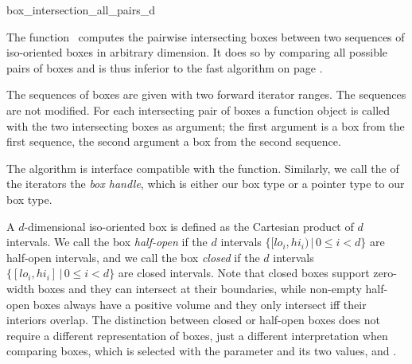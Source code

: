 

\begin{ccRefFunction}{box_intersection_all_pairs_d}

\ccDefinition
  
The function \ccRefName\ computes the pairwise intersecting boxes
between two sequences of iso-oriented boxes in arbitrary dimension.
It does so by comparing all possible pairs of boxes and is thus
inferior to the fast  algorithm on page
\pageref{ccRef_CGAL::box_intersection_d}.

The sequences of boxes are given with two forward iterator ranges. The
sequences are not modified. For each intersecting pair of boxes a
 function object is called with the two intersecting
boxes as argument; the first argument is a box from the first
sequence, the second argument a box from the second sequence.

The algorithm is interface compatible with the
 function. Similarly, we call the
 of the iterators the \emph{box handle}, which is
either our box type or a pointer type to our box type.

A $d$-dimensional iso-oriented box is defined as the
Cartesian product of $d$ intervals. We call the
box \emph{half-open} if the $d$ intervals $\{ [lo_i,hi_i) \,|\, 0 \leq
i < d\}$ are half-open intervals, and we call the box \emph{closed} if
the $d$ intervals $\{ [lo_i,hi_i] \,|\, 0 \leq i < d\}$ are closed
intervals. Note that closed boxes support zero-width boxes and they
can intersect at their boundaries, while non-empty half-open boxes
always have a positive volume and they only intersect iff their
interiors overlap.  The distinction between closed or half-open boxes
does not require a different representation of boxes, just a different
interpretation when comparing boxes, which is selected with the
 parameter and its two values,
 and
.


\end{ccRefFunction}
